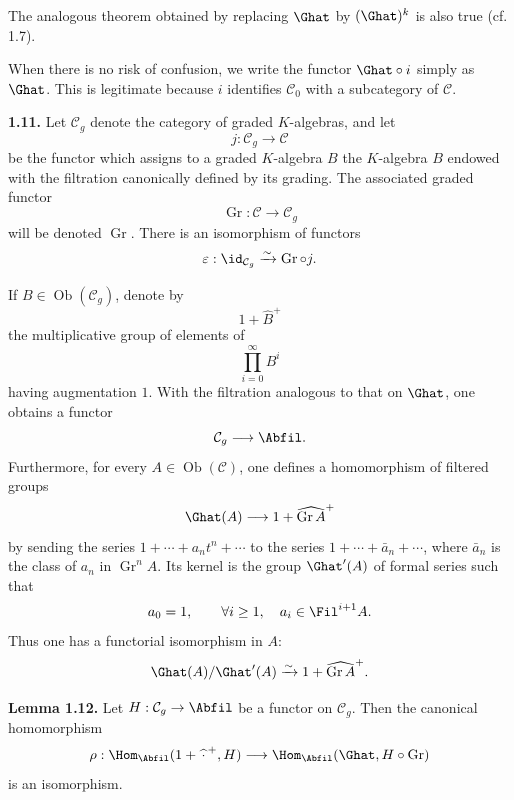 The analogous theorem obtained by replacing \(\Ghat\) by \((\Ghat)^k\) is also true (cf. 1.7).

When there is no risk of confusion, we write the functor \(\Ghat\circ i\) simply as \(\Ghat\). This is legitimate because \(i\) identifies \(\mathcal C_0\) with a subcategory of \(\mathcal C\).

\textbf{1.11.} Let \(\mathcal C_g\) denote the category of graded \(K\)-algebras, and let
\[
  j:\mathcal C_g\longrightarrow\mathcal C
\]
be the functor which assigns to a graded \(K\)-algebra \(B\) the \(K\)-algebra \(B\) endowed with the filtration canonically defined by its grading. The associated graded functor
\[
  \operatorname{Gr}:\mathcal C\longrightarrow \mathcal C_g
\]
will be denoted \(\operatorname{Gr}\). There is an isomorphism of functors
\[
  \varepsilon:\id_{\mathcal C_g}\xrightarrow{\sim}\operatorname{Gr}\circ j.
\]

If \(B\in\operatorname{Ob}(\mathcal C_g)\), denote by
\[
  1+\widehat{B}^{+}
\]
the multiplicative group of elements of
\[
  \prod_{i=0}^{\infty}B^i
\]
having augmentation \(1\). With the filtration analogous to that on \(\Ghat\), one obtains a functor
\[
  \mathcal C_g\longrightarrow\Abfil.
\]
Furthermore, for every \(A\in\operatorname{Ob}(\mathcal C)\), one defines a homomorphism of filtered groups
\[
  \Ghat(A)\longrightarrow 1+\widehat{\operatorname{Gr}A}^{+}
\]
by sending the series \(1+\cdots+a_nt^n+\cdots\) to the series \(1+\cdots+\bar a_n+\cdots\), where \(\bar a_n\) is the class of \(a_n\) in \(\operatorname{Gr}^nA\). Its kernel is the group \(\Ghat'(A)\) of formal series such that
\[
  a_0=1,\qquad \forall i\geq 1,\quad a_i\in\Fil^{i+1}A.
\]
Thus one has a functorial isomorphism in \(A\):
\[
  \Ghat(A)/\Ghat'(A)\xrightarrow{\sim} 1+\widehat{\operatorname{Gr}A}^{+}.
\]

\textbf{Lemma 1.12.} Let \(H:\mathcal C_g\to\Abfil\) be a functor on \(\mathcal C_g\). Then the canonical homomorphism
\[
  \rho:\Hom_{\Abfil}(1+\widehat{\,\cdot\,}^{+},H)
  \longrightarrow
  \Hom_{\Abfil}(\Ghat,H\circ\operatorname{Gr})
\]
is an isomorphism.

